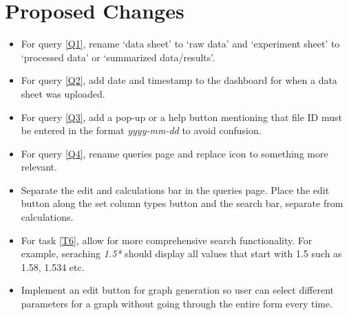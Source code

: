 \documentclass{article}
\begin{document}
\section{Proposed Changes}
\begin{itemize}
  \item For query \ref{Q1}, rename `data sheet' to `raw data' and `experiment sheet' to `processed data' or `summarized data/results'.
  \item For query \ref{Q2}, add date and timestamp to the dashboard for when a data sheet was uploaded.
  \item For query \ref{Q3}, add a pop-up or a help button mentioning that file ID must be entered in the format \emph{yyyy-mm-dd} to avoid 
  confusion.
  \item For query \ref{Q4}, rename queries page and replace icon to something more relevant.
  \item Separate the edit and calculations bar in the queries page. Place the edit button along the set column types button and the search bar,
  separate from calculations.
  \item For task \ref{T6}, allow for more comprehensive search functionality. For example, seraching \emph{1.5*} should display all values that start
  with 1.5 such as 1.58, 1.534 etc.
  \item Implement an edit button for graph generation so user can select different parameters for a graph without going through the entire form every time.
\end{itemize}
\end{document}
